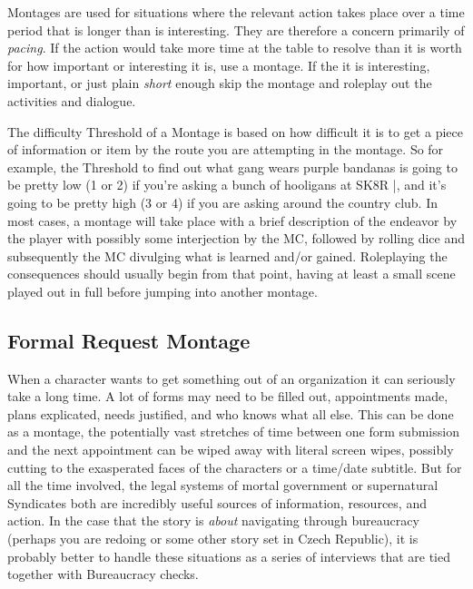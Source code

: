 Montages are used for situations where the relevant action takes place over a time period that is longer than is interesting. They are therefore a concern primarily of \textit{pacing}. If the action would take more time at the table to resolve than it is worth for how important or interesting it is, use a montage. If the it is interesting, important, or just plain \textit{short} enough skip the montage and roleplay out the activities and dialogue.

The difficulty Threshold of a Montage is based on how difficult it is to get a piece of information or item by the route you are attempting in the montage. So for example, the Threshold to find out what gang wears purple bandanas is going to be pretty low (1 or 2) if you're asking a bunch of hooligans at  SK8R |, and it's going to be pretty high (3 or 4) if you are asking around the country club. In most cases, a montage will take place with a brief description of the endeavor by the player with possibly some interjection by the MC, followed by rolling dice and subsequently the MC divulging what is learned and/or gained. Roleplaying the consequences should usually begin from that point, having at least a small scene played out in full before jumping into another montage.

\subsection{Formal Request Montage}

When a character wants to get something out of an organization it can seriously take a long time. A lot of forms may need to be filled out, appointments made, plans explicated, needs justified, and who knows what all else. This can be done as a montage, the potentially vast stretches of time between one form submission and the next appointment can be wiped away with literal screen wipes, possibly cutting to the exasperated faces of the characters or a time/date subtitle. But for all the time involved, the legal systems of mortal government or supernatural Syndicates both are incredibly useful sources of information, resources, and action. In the case that the story is \textit{about} navigating through bureaucracy (perhaps you are redoing  or some other story set in Czech Republic), it is probably better to handle these situations as a series of interviews that are tied together with Bureaucracy checks.

